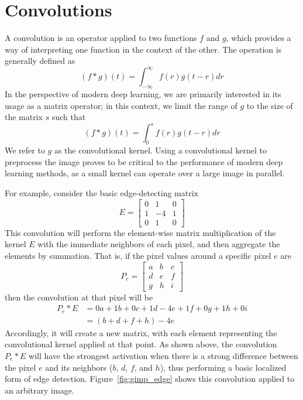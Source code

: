 \section{Convolutions}
A convolution is an operator applied to two functions $f$ and $g$, which provides a way of interpreting one function in the context of the other.
The operation is generally defined as
\[(f * g)(t) = \int_{-\infty}^\infty f(r)g(t-r) dr\]
In the perspective of modern deep learning, we are primarily interested in its usage as a matrix operator; in this context, we limit the range of $g$ to the size of the matrix $s$ such that
\[(f * g)(t) = \int_0^s f(r)g(t-r) dr\]
We refer to $g$ as the convolutional kernel.
Using a convolutional kernel to preprocess the image proves to be critical to the performance of modern deep learning methods, as a small kernel can operate over a large image in parallel.

For example, consider the basic edge-detecting matrix 
\[E = \begin{bmatrix} 0 & 1 & 0 \\ 1 & -4 & 1 \\ 0 & 1 & 0\end{bmatrix}\]
This convolution will perform the element-wise matrix multiplication of the kernel $E$ with the immediate neighbors of each pixel, and then aggregate the elements by summation.
That is, if the pixel values around a specific pixel $e$ are 
\[P_e = \begin{bmatrix} a & b & c \\ d & e & f \\ g & h & i\end{bmatrix}\]
then the convolution at that pixel will be
\begin{align*}
P_e * E &= 0a + 1b + 0c + 1d -4e + 1f + 0g+ 1h + 0i \\
&= (b + d + f + h) - 4e
\end{align*}
Accordingly, it will create a new matrix, with each element representing the convolutional kernel applied at that point.
As shown above, the convolution $P_e * E$ will have the strongest activation when there is a strong difference between the pixel $e$ and its neighbors ($b$, $d$, $f$, and $h$), thus performing a basic localized form of edge detection.
Figure~\ref{fig:gimp_edge} shows this convolution applied to an arbitrary image.


